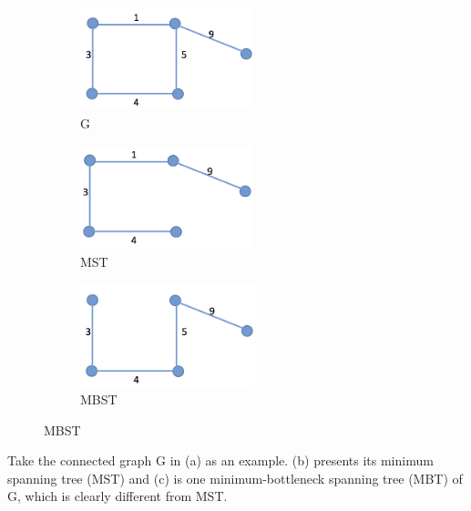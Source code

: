 \documentclass[a4paper,10pt,twoside]{article}
\begin{document}
\begin{figure}[h]
 
\begin{subfigure}{0.3\textwidth}
\includegraphics[width=0.9\linewidth, height=3cm]{G} 
\caption{G}
\label{fig:subim1}
\end{subfigure}
\begin{subfigure}{0.3\textwidth}
\includegraphics[width=0.9\linewidth, height=3cm]{MST}
\caption{MST}
\label{fig:subim2}
\end{subfigure}
 \begin{subfigure}{0.3\textwidth}
\includegraphics[width=0.9\linewidth, height=3cm]{MBST}
\caption{MBST}
\label{fig:subim3}
\end{subfigure}


\end{figure}

Take the connected graph G in (a) as an example. (b) presents its minimum spanning tree (MST) and (c) is one minimum-bottleneck spanning tree (MBT) of G, which is clearly different from MST. 
\end{document}
